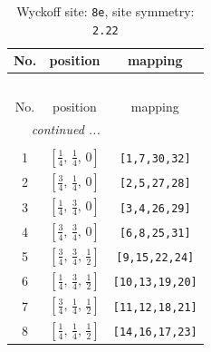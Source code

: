 \documentclass[fleqn,8pt]{jsarticle}
\begin{document}
\renewcommand{\arraystretch}{1.2}
\begin{longtable}{ccc}
\caption{Wyckoff site: {\tt 8e}, site symmetry: {\tt 2.22}}
 \\
 \hline \hline
No. & position & mapping \\ \hline \endfirsthead

\multicolumn{2}{l}{\tablename\ \thetable{}} \\
 \hline \hline
No. & position & mapping \\ \hline \endhead

 \hline \hline
\multicolumn{2}{r}{\footnotesize\it continued ...} \\ \endfoot

 \hline \hline
\multicolumn{2}{r}{} \\ \endlastfoot

1 & $\left[ \frac{1}{4},\, \frac{1}{4},\, 0 \right]$ & {\tt [1,7,30,32]} \\ \hline
2 & $\left[ \frac{3}{4},\, \frac{1}{4},\, 0 \right]$ & {\tt [2,5,27,28]} \\ \hline
3 & $\left[ \frac{1}{4},\, \frac{3}{4},\, 0 \right]$ & {\tt [3,4,26,29]} \\ \hline
4 & $\left[ \frac{3}{4},\, \frac{3}{4},\, 0 \right]$ & {\tt [6,8,25,31]} \\ \hline
5 & $\left[ \frac{3}{4},\, \frac{3}{4},\, \frac{1}{2} \right]$ & {\tt [9,15,22,24]} \\ \hline
6 & $\left[ \frac{1}{4},\, \frac{3}{4},\, \frac{1}{2} \right]$ & {\tt [10,13,19,20]} \\ \hline
7 & $\left[ \frac{3}{4},\, \frac{1}{4},\, \frac{1}{2} \right]$ & {\tt [11,12,18,21]} \\ \hline
8 & $\left[ \frac{1}{4},\, \frac{1}{4},\, \frac{1}{2} \right]$ & {\tt [14,16,17,23]} \\
\end{longtable}
\renewcommand{\arraystretch}{1.2}
\end{document}
